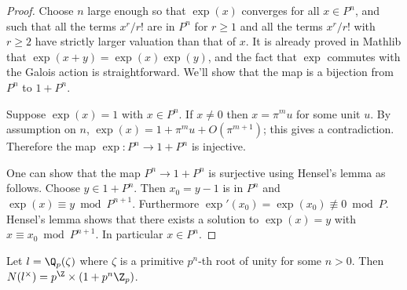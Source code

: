 \begin{proof}
	Choose $n$ large enough so that $\exp(x)$ converges for all $x \in P^n$,
	and such that all the terms $x^r/r!$ are in $P^n$ for $r \ge 1$
	and all the terms $x^r / r!$ with $r \ge 2$ have strictly larger valuation than that of $x$.
	It is already proved in Mathlib that $\exp(x+y)=\exp(x)\exp(y)$, and the fact that $\exp$ commutes
	with the Galois action is straightforward.
	We'll show that the map is a bijection from $P^n$ to $1+P^n$.

	Suppose $\exp(x)=1$ with $x \in P^n$.
	If $x \ne 0$ then $x = \pi^mu$ for some unit $u$.
	By assumption on $n$, $\exp(x) = 1 + \pi^m u + O(\pi^{m+1})$; this gives a contradiction.
	Therefore the map $\exp : P^n \to 1+P^n$ is injective.

	One can show that the map $P^n \to 1+P^n$ is surjective using Hensel's lemma as follows.
	Choose $y \in 1+P^n$. Then $x_0 = y-1$ is in $P^n$ and $\exp(x) \equiv y \bmod P^{n+1}$.
	Furthermore $\exp'(x_0) = \exp(x_0) \not\equiv 0 \bmod P$. Hensel's lemma shows that there exists
	a solution to $\exp(x)=y$ with $x \equiv x_0 \bmod P^{n+1}$.
	In particular $x \in P^n$.
\end{proof}

\begin{lemma} \label{lem:local cyclotomic norms}
	Let $l = \Q_p(\zeta)$ where $\zeta$ is a primitive $p^n$-th root of unity
	for some $n > 0$.
	Then $N(l^\times) = p^\Z \times (1+p^n \Z_p)$.
\end{lemma}

